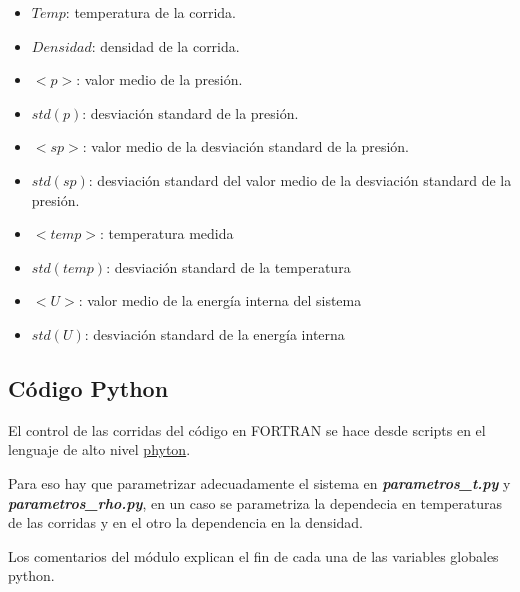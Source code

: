 \begin{itemize}

\item $Temp$: temperatura de la corrida.      
\item $Densidad$: densidad de la corrida.       
\item $<p>$: valor medio de la presión.      
\item $std(p)$: desviación standard de la presión.       
\item $<sp>$: valor medio de la desviación standard de la presión.       
\item $std(sp)$: desviación standard del valor medio de la desviación standard de la presión.    
\item $<temp>$: temperatura medida      
\item $std(temp)$: desviación standard de la temperatura       
\item $<U>$: valor medio de la energía interna del sistema       
\item $std(U)$: desviación standard de la energía interna
\end{itemize}



\subsection{Código Python}

El control de las corridas del código en FORTRAN se hace desde scripts en el lenguaje
de alto nivel  \href{http://www.python.org/}{phyton}. 

Para eso hay que parametrizar adecuadamente el sistema en \textbf{\textit{parametros\_t.py}} y 
\textbf{\textit{parametros\_rho.py}}, en un caso se parametriza la dependecia en temperaturas
de las corridas y en el otro la dependencia en la densidad.
 
Los comentarios del módulo explican el fin de cada una de las variables globales python.

\begingroup
    \fontsize{8pt}{10pt}\selectfont

